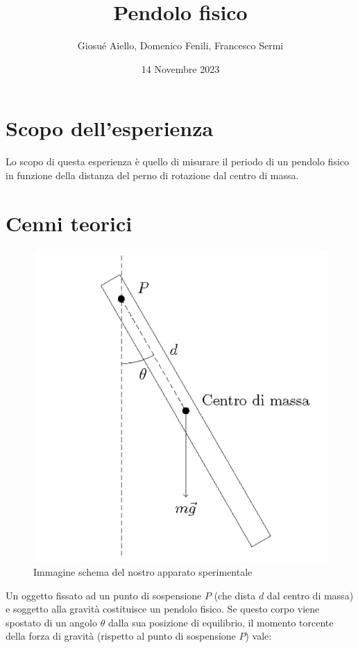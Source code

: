 \documentclass{article}
\title{\Huge{Pendolo fisico}}
\author{\huge{Giosué Aiello, Domenico Fenili, Francesco Sermi}}
\date{14 Novembre 2023}
\begin{document}
\maketitle
\pagebreak
\tableofcontents
\pagebreak

\section{Scopo dell'esperienza}
Lo scopo di questa esperienza è quello di misurare il periodo di un pendolo fisico in funzione della distanza del perno di rotazione dal centro di massa.

\section{Cenni teorici}

\begin{figure}[h!]
	\centering
	\includegraphics[scale=0.35]{pendolo_fisico.png}
	\caption{Immagine schema del nostro apparato sperimentale}
	\label{fig:schema_pendolo}
\end{figure}
Un oggetto fissato ad un punto di sospensione $P$ (che dista $d$ dal centro di massa) e soggetto alla gravità costituisce un pendolo fisico. Se questo corpo viene spostato di un angolo $\theta$ dalla sua posizione di equilibrio, il momento torcente della forza di gravità (rispetto al punto di sospensione $P$) vale:
\end{document}
